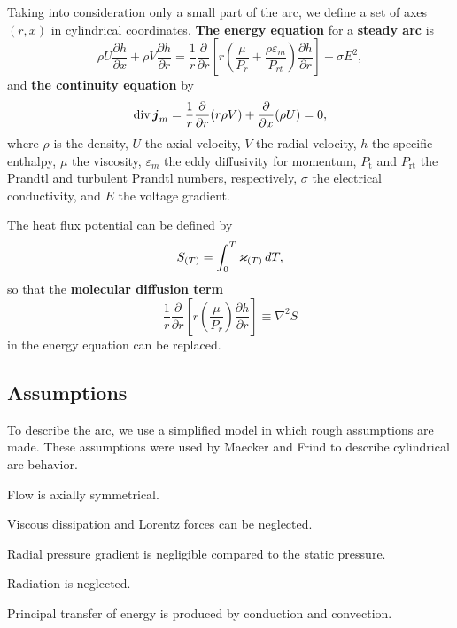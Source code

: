 Taking into consideration only a small part of the arc, we
define a set of axes $(r,x)$ in cylindrical coordinates.
\textbf{The energy equation} for a \textbf{steady arc} is
\begin{equation}
    \rho U \frac{\partial h}{\partial x} + \rho V \frac{\partial h}{\partial r} 
    =
    \frac{1}{r} \frac{\partial }{\partial r} 
    \left[
        r \left(\frac{\mu}{P_r} + \frac{\rho \varepsilon_m}{P_{rt}} \right) 
        \frac{\partial h}{\partial r} 
    \right] + 
    \sigma E^2,
\end{equation}
and \textbf{the continuity equation} by
\begin{equation} %
    \div \vc{j}_m = \frac{1}{r} \frac{\partial }{\partial r} (r \rho V) + \frac{\partial }{\partial x} (\rho U) = 0,
\end{equation}
where $\rho$ is the density, $U$ the axial velocity, $V$ the radial velocity, $h$ the specific enthalpy, $\mu$ the viscosity, $\varepsilon_m$ the eddy diffusivity for momentum, $P_\text{t}$ and $P_\text{rt}$ the Prandtl and turbulent Prandtl numbers, respectively, $\sigma$ the electrical conductivity, and $E$ the voltage gradient.

The heat flux potential can be defined by
\begin{equation*}
    S_{(T)} = \int_0^T \varkappa_{(T)} \, d T,
\end{equation*}
so that the \textbf{molecular diffusion term}
\begin{equation*}
    \frac{1}{r} \frac{\partial }{\partial r} \left[
        r \left(\frac{\mu}{P_r} \right) \frac{\partial h}{\partial r} 
    \right] \equiv \nabla^2 S
\end{equation*}
in the energy equation can be replaced.


\subsection{Assumptions}


To describe the arc, we use a simplified model in which
rough assumptions are made. These assumptions were used 
by Maecker and Frind to describe cylindrical arc behavior. 
\begin{enumerate*}
    \item Flow is axially symmetrical.
    \item Viscous dissipation and Lorentz forces can be neglected.
    \item  Radial pressure gradient is negligible compared to the
        static pressure.
    \item  Radiation is neglected.
    \item  Principal transfer of energy is produced by conduction
        and convection.
\end{enumerate*}


